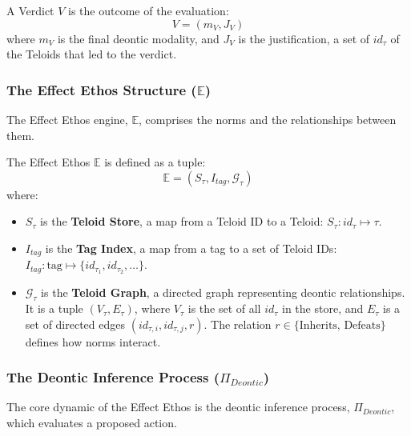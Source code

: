 \begin{definition}[Verdict]
\label{def:ethos_verdict}  
A Verdict \(V\) is the outcome of the evaluation:
\[ V = (m_V, J_V) \]
where \(m_V\) is the final deontic modality, and \(J_V\) is the justification, a set of \(id_\tau\) of the Teloids that led to the verdict.
\end{definition}  

\subsubsection[The Effect Ethos Structure]{The Effect Ethos Structure (\(\mathbb{E}\))}
\label{ssec:ethos_structure_formal}

The Effect Ethos engine, \(\mathbb{E}\), comprises the norms and the relationships between them.


\begin{definition}
\label{def:ethos_effect_ethos}  
The Effect Ethos \(\mathbb{E}\) is defined as a tuple:
\[ \mathbb{E} = (S_\tau, I_{tag}, \mathcal{G}_\tau) \]
where:
\begin{itemize}
    \item \( S_\tau \) is the \textbf{Teloid Store}, a map from a Teloid ID to a Teloid: \( S_\tau: id_\tau \mapsto \tau \).
    \item \( I_{tag} \) is the \textbf{Tag Index}, a map from a tag to a set of Teloid IDs: \( I_{tag}: \text{tag} \mapsto \{id_{\tau_1}, id_{\tau_2}, \dots\} \).
    \item \( \mathcal{G}_\tau \) is the \textbf{Teloid Graph}, a directed graph representing deontic relationships. It is a tuple \( (V_\tau, E_\tau) \), where \(V_\tau\) is the set of all \(id_\tau\) in the store, and \(E_\tau\) is a set of directed edges \( (id_{\tau,i}, id_{\tau,j}, r) \). The relation \( r \in \{\text{Inherits, Defeats}\} \) defines how norms interact.
\end{itemize}
\end{definition}  

\subsubsection[The Deontic Inference Process]{The Deontic Inference Process (\(\Pi_{Deontic}\))}
\label{ssec:deontic_inference_formal}

The core dynamic of the Effect Ethos is the deontic inference process, \(\Pi_{Deontic}\), which evaluates a proposed action.


